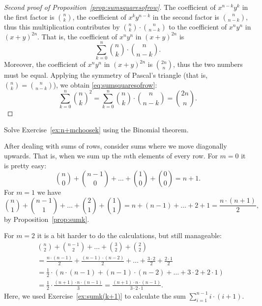 \begin{proof}[Second proof of Proposition~\ref{prop:sumsquaresofrow}]
The coefficient of $x^{n-k}y^k$ in the first factor is $\binom{n}{k}$, the coefficient of $x^ky^{n-k}$ in the second factor is $\binom{n}{n-k}$, 
thus this multiplication contributes by $\binom{n}{k} \cdot \binom{n}{n-k}$ to the coefficient of $x^n y^n $ in $(x+y)^{2n}$. 
That is, the coefficient of $x^n y^n$ in $(x+y)^{2n}$ is 
\[
\sum_{k=0}^n \binom{n}{k} \cdot \binom{n}{n-k}. 
\]
Moreover, the coefficient of $x^ny^n$ in $(x+y)^{2n}$ is $\binom{2n}{n}$, thus the two numbers must be equal. 
Applying the symmetry of Pascal's triangle (that is, $\binom{n}{k} = \binom{n}{n-k}$), 
we obtain \eqref{eq:sumsquaresofrow}:
\[
\sum_{k=0}^n \binom{n}{k}^2 = \sum_{k=0}^n \binom{n}{k} \cdot \binom{n}{n-k} = \binom{2n}{n}. 
\]
\end{proof}

\begin{exercise}\label{ex:n+mchoosek2}
Solve Exercise~\ref{ex:n+mchoosek} using the Binomial theorem. 
\end{exercise}

After dealing with sums of rows, 
consider sums where we move diagonally upwards. 
That is, when we sum up the $m$th elements of every row. 
For $m=0$ it is pretty easy: 
\[
\binom{n}{0} + \binom{n-1}{0} + \dots + \binom{1}{0} + \binom{0}{0} = n+1. 
\]
For $m=1$ we have 
\[
\binom{n}{1} + \binom{n-1}{1} + \dots + \binom{2}{1} + \binom{1}{1} = n + (n-1) + \dots + 2 + 1 = \frac{n\cdot (n+1)}{2}, 
\]
by Proposition~\ref{prop:sumk}. 

For $m=2$ it is a bit harder to do the calculations, but still manageable: 
\begin{align*}
&\binom{n}{2} + \binom{n-1}{2} + \dots + \binom{3}{2} + \binom{2}{2} \\
&= \frac{n \cdot (n-1)}{2} + \frac{(n-1) \cdot (n-2)}{2} + \dots + \frac{3 \cdot 2}{2} + \frac{2 \cdot 1}{2} \\
&= \frac12 \cdot \left( n \cdot (n-1) + (n-1) \cdot (n-2) + \dots + 3 \cdot 2 + 2 \cdot 1 \right) \\
&= \frac12 \cdot \frac{(n+1) \cdot n \cdot (n-1)}{3} = \frac{(n+1) \cdot n \cdot (n-1)}{3 \cdot 2 \cdot 1}. 
\end{align*}
Here, we used Exercise~\ref{ex:sumk(k+1)} to calculate the sum $\sum_{i=1}^{n-1} i \cdot (i+1)$. 

